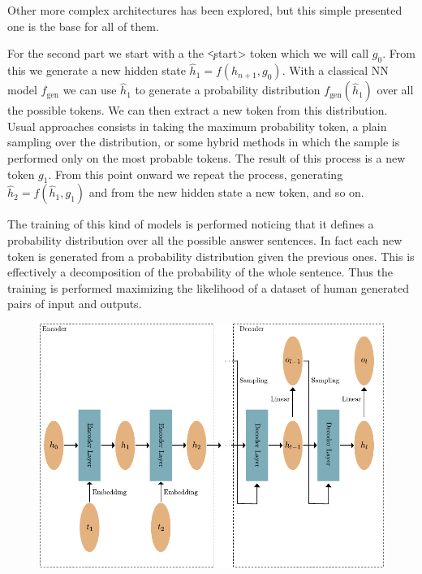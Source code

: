 \documentclass[]{marticle}
\begin{document}
Other more complex architectures has been explored, but this simple presented one is the base for
all of them.

For the second part we start with a the \c{<start>} token which we will call $g_0$. From this we
generate a new hidden state $\hat{h}_1 = f(h_{n+1}, g_0)$. With a classical NN model $f_\text{gen}$ we can
use $\hat{h}_1$ to generate a probability distribution $f_\text{gen} (\hat{h}_1)$ over all the possible
tokens. We can then extract a new token from this distribution. Usual approaches consists in taking
the maximum probability token, a plain sampling over the distribution, or some hybrid methods in
which the sample is performed only on the most probable tokens. The result of this process is a new
token $g_1$. From this point onward we repeat the process, generating $\hat{h}_2 = f(\hat{h}_1, g_1)$
and from the new hidden state a new token, and so on.

The training of this kind of models is performed noticing that it defines a probability distribution
over all the possible answer sentences. In fact each new token is generated from a probability
distribution given the previous ones. This is effectively a decomposition of the probability of the
whole sentence. Thus the training is performed maximizing the likelihood of a dataset of human
generated pairs of input and outputs.

\begin{figure}[ht] 
\begin{center}
\includegraphics{recurrent_simple.pdf}
\caption{} 
\end{center}
\end{figure}
\end{document}

